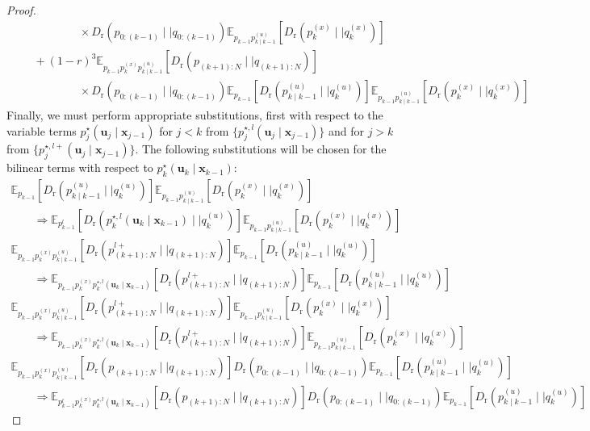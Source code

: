 \documentclass[10pt,a4paper]{amsart}
\newcommand{\Dr}[2]{{D}_{\text{r}}\left(#1\mid \mid #2 \right)}
\newcommand{\E}{\mathbb{E}}
\newcommand{\bv}[1]{\mathbf{#1}}
\newcommand{\optimalpolicy}[2]{p^{\star}_{{#1}} \left(\bv{u}_{{#1}}\mid \bv{x}_{{#2}} \right)}
\newcommand{\optimalpolicygen}[3]{p^{\star,{#3}}_{{#1}} \left(\bv{u}_{{#1}}\mid \bv{x}_{{#2}} \right)}
\newcommand{\shortplant}[1]{p_{{#1}}^{(x)}}
\newcommand{\shortpolicy}[2]{p_{{#1}\mid{#2}}^{(u)}}
\begin{document}
\begin{proof}
\begin{equation}
\begin{array}{l}
\qquad\qquad\qquad \times \Dr{p_{0:(k-1)}}{q_{0:(k-1)}}\E_{p_{k-1}\shortpolicy{k}{k-1}}\left[\Dr{\shortplant{k}}{q^{(x)}_k}\right] 
\\ \qquad + (1-r)^3  \E_{p_{k-1}\shortplant{k}\shortpolicy{k}{k-1}}\left[\Dr{p_{(k+1):N}}{q_{(k+1):N}}\right] \\ 
\qquad\qquad\qquad \times \Dr{p_{0:(k-1)}}{q_{0:(k-1)}}\E_{p_{k-1}}\left[\Dr{\shortpolicy{k}{k-1}}{q^{(u)}_k}\right]\E_{p_{k-1}\shortpolicy{k}{k-1}}\left[\Dr{\shortplant{k}}{q^{(x)}_k}\right]
\end{array}
\end{equation}
Finally, we must perform appropriate substitutions, first with respect to the variable terms $\optimalpolicy{j}{j-1}$ for $j<k$ from $\{\optimalpolicygen{j}{j-1}{l}\}$
and for $j>k$ from $\{\optimalpolicygen{j}{j-1}{l+}\}$. The following substitutions will be chosen for the bilinear terms with respect to $\optimalpolicy{k}{k-1}$:
\[
\begin{array}{l}
\E_{p_{k-1}}\left[\Dr{\shortpolicy{k}{k-1}}{q^{(u)}_k}\right]\E_{p_{k-1}\shortpolicy{k}{k-1}}\left[\Dr{\shortplant{k}}{q^{(x)}_k}\right] \\ \qquad \Rightarrow
\E_{p^l_{k-1}}\left[\Dr{\optimalpolicygen{k}{k-1}{l}}{q^{(u)}_k}\right]\E_{p_{k-1}\shortpolicy{k}{k-1}}\left[\Dr{\shortplant{k}}{q^{(x)}_k}\right]
\\ 
\E_{p_{k-1}\shortplant{k}\shortpolicy{k}{k-1}}\left[\Dr{p^{l+}_{(k+1):N}}{q_{(k+1):N}}\right]
\E_{p_{k-1}}\left[\Dr{\shortpolicy{k}{k-1}}{q^{(u)}_k}\right] \\ \qquad 
\Rightarrow 
\E_{p_{k-1}\shortplant{k}\optimalpolicygen{k}{k-1}{l}}\left[\Dr{p^{l+}_{(k+1):N}}{q_{(k+1):N}}\right]
\E_{p_{k-1}}\left[\Dr{\shortpolicy{k}{k-1}}{q^{(u)}_k}\right]
\\ 
 \E_{p_{k-1}\shortplant{k}\shortpolicy{k}{k-1}}\left[\Dr{p^{l+}_{(k+1):N}}{q_{(k+1):N}}\right]
\E_{p_{k-1}\shortpolicy{k}{k-1}}\left[\Dr{\shortplant{k}}{q^{(x)}_k}\right] \\ \qquad  \Rightarrow
\E_{p_{k-1}\shortplant{k}\optimalpolicygen{k}{k-1}{l}}\left[\Dr{p^{l+}_{(k+1):N}}{q_{(k+1):N}}\right]
\E_{p_{k-1}\shortpolicy{k}{k-1}}\left[\Dr{\shortplant{k}}{q^{(x)}_k}\right]
 \\ 
 \E_{p_{k-1}\shortplant{k}\shortpolicy{k}{k-1}}\left[\Dr{p_{(k+1):N}}{q_{(k+1):N}}\right] \Dr{p_{0:(k-1)}}{q_{0:(k-1)}}\E_{p_{k-1}}\left[\Dr{\shortpolicy{k}{k-1}}{q^{(u)}_k}\right] \\ \qquad \Rightarrow
  \E_{p^l_{k-1}\shortplant{k}\optimalpolicygen{k}{k-1}{l}}\left[\Dr{p_{(k+1):N}}{q_{(k+1):N}}\right] \Dr{p_{0:(k-1)}}{q_{0:(k-1)}}\E_{p_{k-1}}\left[\Dr{\shortpolicy{k}{k-1}}{q^{(u)}_k}\right] 

\end{array}\]
\end{proof}
\end{document}
